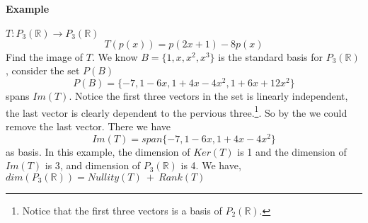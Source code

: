 \documentclass[11pt]{article}
\begin{document}
	\paragraph{Example} $T: P_3(\mathbb{R}) \to P_3(\mathbb{R})$
	\[
		T(p(x)) = p(2x+1) - 8p(x)
	\] Find the image of $T$.
	\newline We know $B = \{1,x,x^2,x^3\}$ is the standard basis for $P_3(\mathbb{R})$, consider the set $P(B)$
	\[
		P(B) = \{-7, 1-6x, 1 + 4x - 4x^2, 1 + 6x + 12 x^2\}
	\]
	spans $Im(T)$. Notice the first three vectors in the set is linearly independent, the last vector is clearly dependent to the pervious three.\footnote{Notice that the first three vectors is a basis of $P_2(\mathbb{R})$.}. So by the  we could remove the last vector. There we have
	\[
		Im(T) = span\{-7, 1-6x, 1 + 4x - 4x^2\}
	\]
	as basis.
	\newline In this example, the dimension of $Ker(T)$ is 1 and the dimension of $Im(T)$ is 3, and dimension of $P_3(\mathbb{R})$ is 4. We have, $dim(P_3(\mathbb{R})) = Nullity(T)\ +\ Rank(T)$
	
\end{document}

